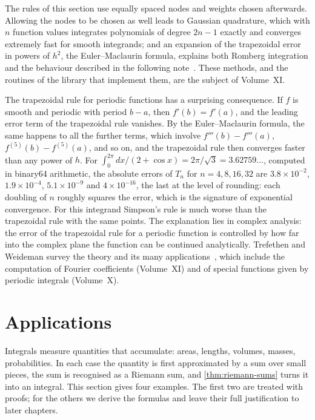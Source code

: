 The rules of this section use equally spaced nodes and weights chosen afterwards. Allowing the nodes to be chosen as well leads to Gaussian quadrature, which with $n$ function values integrates polynomials of degree $2n-1$ exactly and converges extremely fast for smooth integrands; and an expansion of the trapezoidal error in powers of $h^2$, the Euler--Maclaurin formula, explains both Romberg integration and the behaviour described in the following note~\cite{davis1984}. These methods, and the routines of the library that implement them, are the subject of Volume~XI.

\begin{note}{The trapezoidal rule for periodic functions}
 has a surprising consequence. If $f$ is smooth and periodic with period $b-a$, then $f'(b)=f'(a)$, and the leading error term of the trapezoidal rule vanishes. By the Euler--Maclaurin formula, the same happens to all the further terms, which involve $f'''(b)-f'''(a)$, $f^{(5)}(b)-f^{(5)}(a)$, and so on, and the trapezoidal rule then converges faster than any power of $h$. For $\int_0^{2\pi}dx/(2+\cos x)=2\pi/\sqrt3=3.62759\ldots$, computed in binary64 arithmetic, the absolute errors of $T_n$ for $n=4,8,16,32$ are $3.8\times10^{-2}$, $1.9\times10^{-4}$, $5.1\times10^{-9}$ and $4\times10^{-16}$, the last at the level of rounding: each doubling of $n$ roughly squares the error, which is the signature of exponential convergence. For this integrand Simpson's rule is much worse than the trapezoidal rule with the same points. The explanation lies in complex analysis: the error of the trapezoidal rule for a periodic function is controlled by how far into the complex plane the function can be continued analytically. Trefethen and Weideman survey the theory and its many applications~\cite{trefethen2014}, which include the computation of Fourier coefficients (Volume~XI) and of special functions given by periodic integrals (Volume~X).
\end{note}

\section{Applications}
\label{sec:integral-applications}

Integrals measure quantities that accumulate: areas, lengths, volumes, masses, probabilities. In each case the quantity is first approximated by a sum over small pieces, the sum is recognised as a Riemann sum, and \cref{thm:riemann-sums} turns it into an integral. This section gives four examples. The first two are treated with proofs; for the others we derive the formulas and leave their full justification to later chapters.

